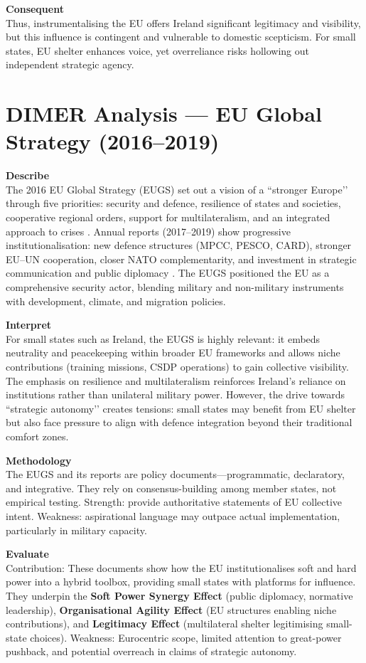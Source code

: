 \textbf{Consequent} \\
Thus, instrumentalising the EU offers Ireland significant legitimacy and visibility, but this influence is contingent and vulnerable to domestic scepticism. For small states, EU shelter enhances voice, yet overreliance risks hollowing out independent strategic agency.  


\section*{DIMER Analysis — EU Global Strategy (2016–2019)}

\textbf{Describe} \\  
The 2016 EU Global Strategy (EUGS) set out a vision of a ``stronger Europe’’ through five priorities: security and defence, resilience of states and societies, cooperative regional orders, support for multilateralism, and an integrated approach to crises \parencite{EU_2016}. Annual reports (2017–2019) show progressive institutionalisation: new defence structures (MPCC, PESCO, CARD), stronger EU–UN cooperation, closer NATO complementarity, and investment in strategic communication and public diplomacy \parencite{EU_2017,EU_2018,EU_2019} . The EUGS positioned the EU as a comprehensive security actor, blending military and non-military instruments with development, climate, and migration policies.  

\textbf{Interpret} \\  
For small states such as Ireland, the EUGS is highly relevant: it embeds neutrality and peacekeeping within broader EU frameworks and allows niche contributions (training missions, CSDP operations) to gain collective visibility. The emphasis on resilience and multilateralism reinforces Ireland’s reliance on institutions rather than unilateral military power. However, the drive towards ``strategic autonomy’’ creates tensions: small states may benefit from EU shelter but also face pressure to align with defence integration beyond their traditional comfort zones.  

\textbf{Methodology} \\  
The EUGS and its reports are policy documents—programmatic, declaratory, and integrative. They rely on consensus-building among member states, not empirical testing. Strength: provide authoritative statements of EU collective intent. Weakness: aspirational language may outpace actual implementation, particularly in military capacity.  

\textbf{Evaluate} \\  
Contribution: These documents show how the EU institutionalises soft and hard power into a hybrid toolbox, providing small states with platforms for influence. They underpin the \textbf{Soft Power Synergy Effect} (public diplomacy, normative leadership), \textbf{Organisational Agility Effect} (EU structures enabling niche contributions), and \textbf{Legitimacy Effect} (multilateral shelter legitimising small-state choices). Weakness: Eurocentric scope, limited attention to great-power pushback, and potential overreach in claims of strategic autonomy.  

